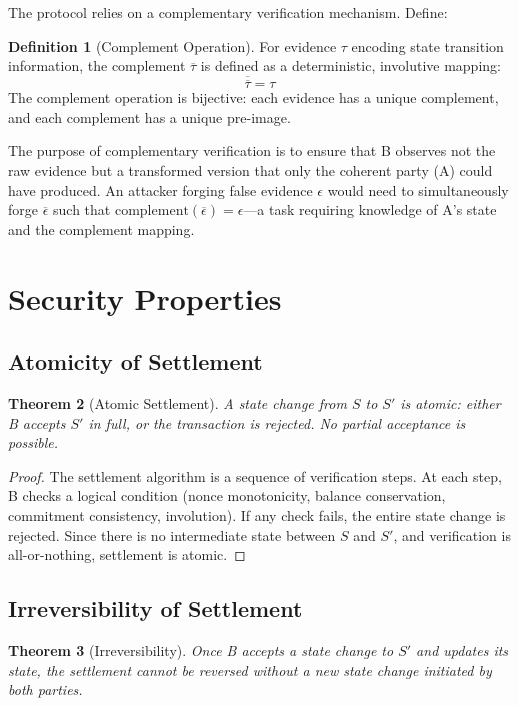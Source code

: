 \documentclass[twocolumn,10pt,a4paper]{article}
\theoremstyle{plain}
\newtheorem{theorem}{Theorem}[section]
\theoremstyle{definition}
\newtheorem{definition}[theorem]{Definition}
\newcommand{\comp}[1]{\overline{#1}}
\begin{document}
The protocol relies on a complementary verification mechanism. Define:

\begin{definition}[Complement Operation]
For evidence $\tau$ encoding state transition information, the complement $\comp{\tau}$ is defined as a deterministic, involutive mapping:
\[
\comp{\comp{\tau}} = \tau
\]
The complement operation is bijective: each evidence has a unique complement, and each complement has a unique pre-image.
\end{definition}

The purpose of complementary verification is to ensure that B observes not the raw evidence but a transformed version that only the coherent party (A) could have produced. An attacker forging false evidence $\epsilon$ would need to simultaneously forge $\comp{\epsilon}$ such that $\mathrm{complement}(\comp{\epsilon}) = \epsilon$—a task requiring knowledge of A's state and the complement mapping.

\section{Security Properties}
\label{sec:security}

\subsection{Atomicity of Settlement}

\begin{theorem}[Atomic Settlement]
A state change from $S$ to $S'$ is atomic: either B accepts $S'$ in full, or the transaction is rejected. No partial acceptance is possible.
\end{theorem}

\begin{proof}
The settlement algorithm is a sequence of verification steps. At each step, B checks a logical condition (nonce monotonicity, balance conservation, commitment consistency, involution). If any check fails, the entire state change is rejected. Since there is no intermediate state between $S$ and $S'$, and verification is all-or-nothing, settlement is atomic.
\end{proof}

\subsection{Irreversibility of Settlement}

\begin{theorem}[Irreversibility]
Once B accepts a state change to $S'$ and updates its state, the settlement cannot be reversed without a new state change initiated by both parties.
\end{theorem}
\end{document}
